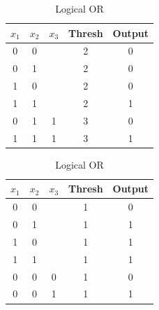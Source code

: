 \begin{table}[]
	\centering
	\caption{Truth Tables of Logical Operations}
	\label{tab:logical-operations}
	\begin{subtable}{.5\textwidth}
		\centering
		\caption{Logical AND}
		\label{tab:logical-and}
		\begin{tabular}{ccc|c|c}
			\hline
			$x_1$ & $x_2$ & $x_3$ & Thresh & Output \\ \hline
			0           & 0           &             & 2     & 0      \\
			0           & 1           &             & 2     & 0      \\
			1           & 0           &             & 2     & 0      \\
			1           & 1           &             & 2     & 1      \\ \hline
			0           & 1           & 1           & 3     & 0      \\
			1           & 1           & 1           & 3     & 1      \\
		\end{tabular}
	\end{subtable}%
	\begin{subtable}{.5\textwidth}
		\centering
		\caption{Logical OR}
		\label{tab:logical-or}
		\begin{tabular}{ccc|c|c}
			\hline
			$x_1$ & $x_2$ & $x_3$ & Thresh & Output \\ \hline
			0           & 0           &             & 1     & 0      \\
			0           & 1           &             & 1     & 1      \\
			1           & 0           &             & 1     & 1      \\
			1           & 1           &             & 1     & 1      \\ \hline
			0           & 0           & 0           & 1     & 0      \\
			0           & 0           & 1           & 1     & 1      \\
		\end{tabular}
	\end{subtable}
	

\end{table}
